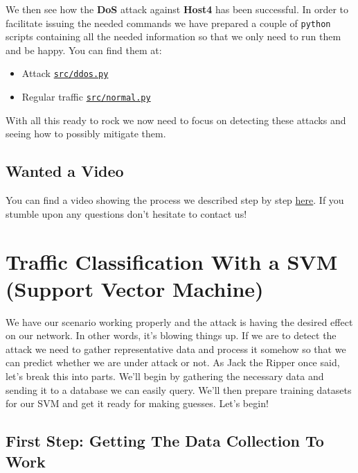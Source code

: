 \documentclass[12pt]{article}
\begin{document}
		We then see how the \textbf{DoS} attack against \textbf{Host4} has been successful. In order to facilitate issuing the needed commands we have prepared a couple of \texttt{python} scripts containing all the needed information so that we only need to run them and be happy. You can find them at:

		\begin{itemize}
			\item Attack \href{https://github.com/GAR-Project/project/blob/master/src/ddos.py}{\texttt{src/ddos.py}}
			\item Regular traffic \href{https://github.com/GAR-Project/project/blob/master/src/normal.py}{\texttt{src/normal.py}}
		\end{itemize}

		With all this ready to rock we now need to focus on detecting these attacks and seeing how to possibly mitigate them.

	\subsection{Wanted a Video}
		You can find a video showing the process we described step by step \href{https://www.youtube.com/watch?v=ofZPmV6_y_M}{here}. If you stumble upon any questions don't hesitate to contact us!
\newpage
\section{Traffic Classification With a SVM (\textbf{S}upport \textbf{V}ector \textbf{M}achine)}
	We have our scenario working properly and the attack is having the desired effect on our network. In other words, it's blowing things up. If we are to detect the attack we need to gather representative data and process it somehow so that we can predict whether we are under attack or not. As Jack the Ripper once said, let's break this into parts. We'll begin by gathering the necessary data and sending it to a database we can easily query. We'll then prepare training datasets for our SVM and get it ready for making guesses. Let's begin!

	\subsection{First Step: Getting The Data Collection To Work}
\end{document}
